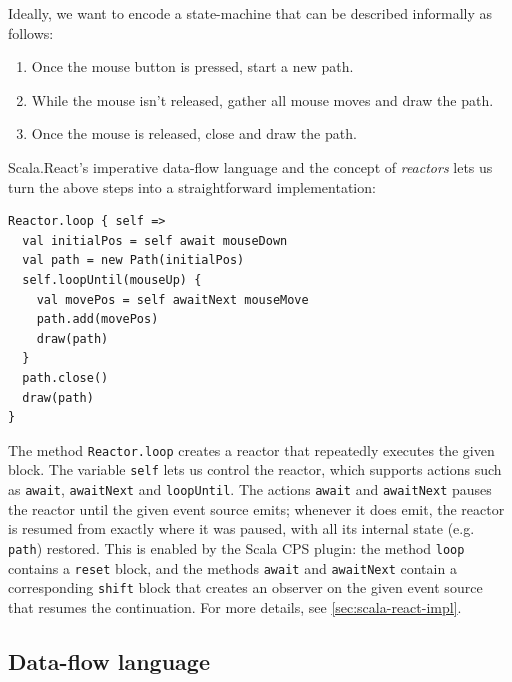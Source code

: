 Ideally, we want to encode a state-machine that can be described informally as follows:
\begin{enumerate}
\item Once the mouse button is pressed, start a new path.
\item While the mouse isn't released, gather all mouse moves and draw the path.
\item Once the mouse is released, close and draw the path.
\end{enumerate}

Scala.React's imperative data-flow language and the concept of \emph{reactors} lets us turn the above steps into a straightforward implementation:

\begin{lstlisting}
Reactor.loop { self =>
  val initialPos = self await mouseDown
  val path = new Path(initialPos)
  self.loopUntil(mouseUp) {
    val movePos = self awaitNext mouseMove
    path.add(movePos)
    draw(path)
  }
  path.close()
  draw(path)
}
\end{lstlisting}

The method \texttt{Reactor.loop} creates a reactor that repeatedly executes the given block. The variable \texttt{self} lets us control the reactor, which supports actions such as \texttt{await}, \texttt{awaitNext} and \texttt{loopUntil}. The actions \texttt{await} and \texttt{awaitNext} pauses the reactor until the given event source emits; whenever it does emit, the reactor is resumed from exactly where it was paused, with all its internal state (e.g. \texttt{path}) restored. This is enabled by the Scala CPS plugin: the method \texttt{loop} contains a \texttt{reset} block, and the methods \texttt{await} and \texttt{awaitNext} contain a corresponding \texttt{shift} block that creates an observer on the given event source that resumes the continuation. For more details, see \ref{sec:scala-react-impl}.

\subsection{Data-flow language}

